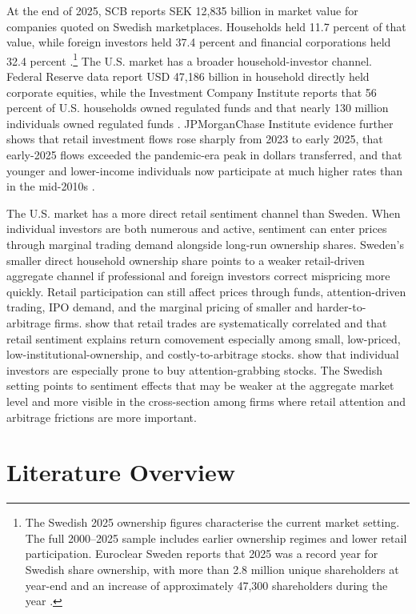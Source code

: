 \documentclass[11pt]{article}
\begin{document}
At the end of 2025, SCB reports SEK 12,835 billion in market value for companies quoted on Swedish marketplaces. Households held 11.7 percent of that value, while foreign investors held 37.4 percent and financial corporations held 32.4 percent \citep{scb2026shareholders}.\footnote{The Swedish 2025 ownership figures characterise the current market setting. The full 2000--2025 sample includes earlier ownership regimes and lower retail participation. Euroclear Sweden reports that 2025 was a record year for Swedish share ownership, with more than 2.8 million unique shareholders at year-end and an increase of approximately 47,300 shareholders during the year \citep{euroclear2026shareownership}.} The U.S. market has a broader household-investor channel. Federal Reserve data report USD 47,186 billion in household directly held corporate equities, while the Investment Company Institute reports that 56 percent of U.S. households owned regulated funds and that nearly 130 million individuals owned regulated funds \citep{federalreserve2026z1,ici2026factbook}. JPMorganChase Institute evidence further shows that retail investment flows rose sharply from 2023 to early 2025, that early-2025 flows exceeded the pandemic-era peak in dollars transferred, and that younger and lower-income individuals now participate at much higher rates than in the mid-2010s \citep{wheat2025decade}.

The U.S. market has a more direct retail sentiment channel than Sweden. When individual investors are both numerous and active, sentiment can enter prices through marginal trading demand alongside long-run ownership shares. Sweden's smaller direct household ownership share points to a weaker retail-driven aggregate channel if professional and foreign investors correct mispricing more quickly. Retail participation can still affect prices through funds, attention-driven trading, IPO demand, and the marginal pricing of smaller and harder-to-arbitrage firms. \citet{kumar2006retail} show that retail trades are systematically correlated and that retail sentiment explains return comovement especially among small, low-priced, low-institutional-ownership, and costly-to-arbitrage stocks. \citet{barber2008glitters} show that individual investors are especially prone to buy attention-grabbing stocks. The Swedish setting points to sentiment effects that may be weaker at the aggregate market level and more visible in the cross-section among firms where retail attention and arbitrage frictions are more important.

\section{Literature Overview}
\end{document}
